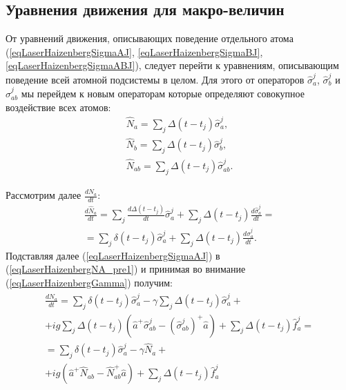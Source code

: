 \subsection{Уравнения движения для макро-величин}
От уравнений движения, описывающих поведение отдельного атома
(\ref{eqLaserHaizenbergSigmaAJ}, \ref{eqLaserHaizenbergSigmaBJ},
\ref{eqLaserHaizenbergSigmaABJ}), следует перейти к уравнениям,
описывающим поведение всей атомной подсистемы в целом. Для этого от
операторов $\hat{\sigma}^{j}_{a}$, $\hat{\sigma}^{j}_{b}$ и
$\hat{\sigma}^{j}_{ab}$ мы перейдем к новым операторам которые
определяют совокупное воздействие всех атомов:
\begin{eqnarray}
\hat{N}_{a} = \sum_j \Delta\left(t - t_j\right)\hat{\sigma}^{j}_{a}, 
\nonumber \\
\hat{N}_{b} = \sum_j \Delta\left(t - t_j\right)\hat{\sigma}^{j}_{b}, 
\nonumber \\
\hat{N}_{ab} = \sum_j \Delta\left(t - t_j\right)\hat{\sigma}^{j}_{ab}.
\label{eqLaserHaizenbergSigmaMacroDef}
\end{eqnarray}

Рассмотрим далее $\frac{d \hat{N}_{a}}{d t}$:
\begin{eqnarray}
\frac{d \hat{N}_{a}}{d t} = 
\sum_j \frac{d \Delta\left(t - t_j\right)}{d t}\hat{\sigma}^{j}_{a} +
\sum_j \Delta\left(t - t_j\right)\frac{d \hat{\sigma}^{j}_{a}}{d t} = 
\nonumber \\
= \sum_j \delta\left(t - t_j\right)\hat{\sigma}^{j}_{a} + \sum_j
\Delta\left(t - t_j\right)\frac{d \hat{\sigma}^{j}_{a}}{d t}. 
\label{eqLaserHaizenbergNA_pre1}
\end{eqnarray}
Подставляя далее (\ref{eqLaserHaizenbergSigmaAJ}) в
(\ref{eqLaserHaizenbergNA_pre1}) и принимая во внимание
(\ref{eqLaserHaizenbergGamma}) получим:
\begin{eqnarray}
\frac{d \hat{N}_{a}}{d t} 
= \sum_j \delta\left(t - t_j\right)\hat{\sigma}^{j}_{a} - \gamma
\sum_j \Delta\left(t - t_j\right) \hat{\sigma}_{a}^{j} +
\nonumber \\
+
i g \sum_j
\Delta\left(t - t_j\right) 
 \left(
\hat{a}^{+}\hat{\sigma}^{j}_{ab} -
\left(\hat{\sigma}^{j}_{ab}\right)^{+}\hat{a}
\right) + \sum_j \Delta\left(t - t_j\right) \hat{f}_{a}^{j} = 
\nonumber \\
= 
\sum_j \delta\left(t - t_j\right)\hat{\sigma}^{j}_{a} - \gamma
\hat{N}_{a} + 
\nonumber \\ 
+ i g  \left(
\hat{a}^{+}\hat{N}_{ab} -
\hat{N}_{ab}^{+}\hat{a}
\right) + \sum_j \Delta\left(t - t_j\right) \hat{f}_{a}^{j}
\label{eqLaserHaizenbergNA_pre2}
\end{eqnarray}

